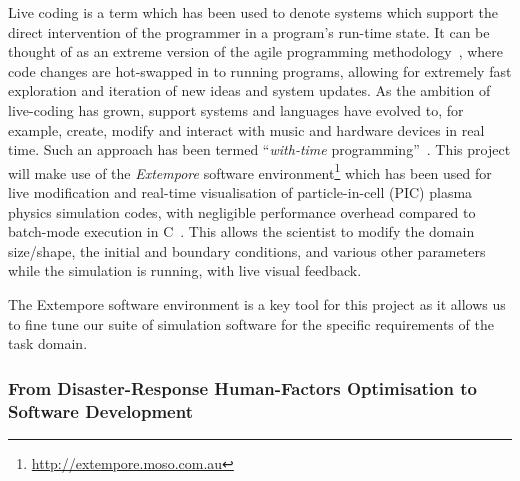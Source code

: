 \documentclass[a4paper,fontsize=12pt]{scrartcl}
\begin{document}
Live coding is a term which has been used to denote systems which
support the direct intervention of the programmer in a program's
run-time state. It can be thought of as an extreme version of the
agile programming methodology~\parencite{fowler_agile_2001}, where
code changes are hot-swapped in to running programs, allowing for
extremely fast exploration and iteration of new ideas and system
updates. As the ambition of live-coding has grown, support systems and
languages have evolved to, for example, create, modify and interact
with music and hardware devices in real time. Such an approach has
been termed ``\emph{with-time}
programming''~\parencite{sorensen2010programming}. This project will
make use of the \emph{Extempore} software
environment\footnote{\url{http://extempore.moso.com.au}} which has
been used for live modification and real-time visualisation of
particle-in-cell (PIC) plasma physics simulation codes, with
negligible performance overhead compared to batch-mode execution in
C~\parencite{swift_live_2016}. This allows the scientist to modify the
domain size/shape, the initial and boundary conditions, and various
other parameters while the simulation is running, with live visual
feedback.

The Extempore software environment is a key tool for this project as
it allows us to fine tune our suite of simulation software for the
specific requirements of the task domain.


\subsubsection*{From Disaster-Response Human-Factors Optimisation to Software Development}



\end{document}
